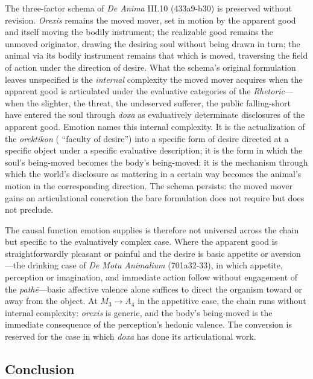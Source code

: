 The three-factor schema of \textit{De Anima} III.10 (433a9-b30) is preserved without revision. \textit{Orexis} remains the moved mover, set in motion by the apparent good and itself moving the bodily instrument; the realizable good remains the unmoved originator, drawing the desiring soul without being drawn in turn; the animal via its bodily instrument remains that which is moved, traversing the field of action under the direction of desire. What the schema's original formulation leaves unspecified is the \textit{internal} complexity the moved mover acquires when the apparent good is articulated under the evaluative categories of the \textit{Rhetoric}---when the slighter, the threat, the undeserved sufferer, the public falling-short have entered the soul through \textit{doxa} as evaluatively determinate disclosures of the apparent good. Emotion names this internal complexity. It is the actualization of the \textit{orektikon} ( ``faculty of desire'') into a specific form of desire directed at a specific object under a specific evaluative description; it is the form in which the soul's being-moved becomes the body's being-moved; it is the mechanism through which the world's disclosure as mattering in a certain way becomes the animal's motion in the corresponding direction. The schema persists: the moved mover gains an articulational concretion the bare formulation does not require but does not preclude.

The causal function emotion supplies is therefore not universal across the chain but specific to the evaluatively complex case. Where the apparent good is straightforwardly pleasant or painful and the desire is basic appetite or aversion---the drinking case of \textit{De Motu Animalium} (701a32-33), in which appetite, perception or imagination, and immediate action follow without engagement of the \textit{pathē}---basic affective valence alone suffices to direct the organism toward or away from the object. At $M_3 \rightarrow A_4$ in the appetitive case, the chain runs without internal complexity: \textit{orexis} is generic, and the body's being-moved is the immediate consequence of the perception's hedonic valence. The conversion is reserved for the case in which \textit{doxa} has done its articulational work. 

\subsection{Conclusion}

